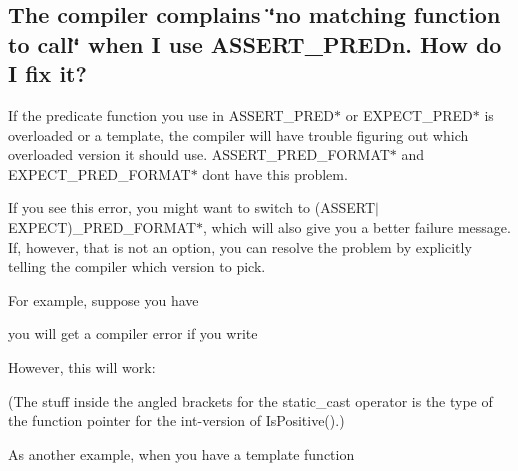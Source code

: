 \subsection*{The compiler complains \char`\"{}no matching function to call\char`\"{} when I use A\+S\+S\+E\+R\+T\+\_\+\+P\+R\+E\+Dn. How do I fix it?}

If the predicate function you use in {\ttfamily A\+S\+S\+E\+R\+T\+\_\+\+P\+R\+E\+D$\ast$} or {\ttfamily E\+X\+P\+E\+C\+T\+\_\+\+P\+R\+E\+D$\ast$} is overloaded or a template, the compiler will have trouble figuring out which overloaded version it should use. {\ttfamily A\+S\+S\+E\+R\+T\+\_\+\+P\+R\+E\+D\+\_\+\+F\+O\+R\+M\+A\+T$\ast$} and {\ttfamily E\+X\+P\+E\+C\+T\+\_\+\+P\+R\+E\+D\+\_\+\+F\+O\+R\+M\+A\+T$\ast$} don\textquotesingle{}t have this problem.

If you see this error, you might want to switch to {\ttfamily (A\+S\+S\+E\+R\+T$\vert$\+E\+X\+P\+E\+CT)\+\_\+\+P\+R\+E\+D\+\_\+\+F\+O\+R\+M\+A\+T$\ast$}, which will also give you a better failure message. If, however, that is not an option, you can resolve the problem by explicitly telling the compiler which version to pick.

For example, suppose you have


\begin{DoxyCode}{0}
\DoxyCodeLine{\}}
\DoxyCodeLine{\}}
\end{DoxyCode}


you will get a compiler error if you write


\begin{DoxyCode}{0}
\end{DoxyCode}


However, this will work\+:


\begin{DoxyCode}{0}
\end{DoxyCode}


(The stuff inside the angled brackets for the {\ttfamily static\+\_\+cast} operator is the type of the function pointer for the {\ttfamily int}-\/version of {\ttfamily Is\+Positive()}.)

As another example, when you have a template function


